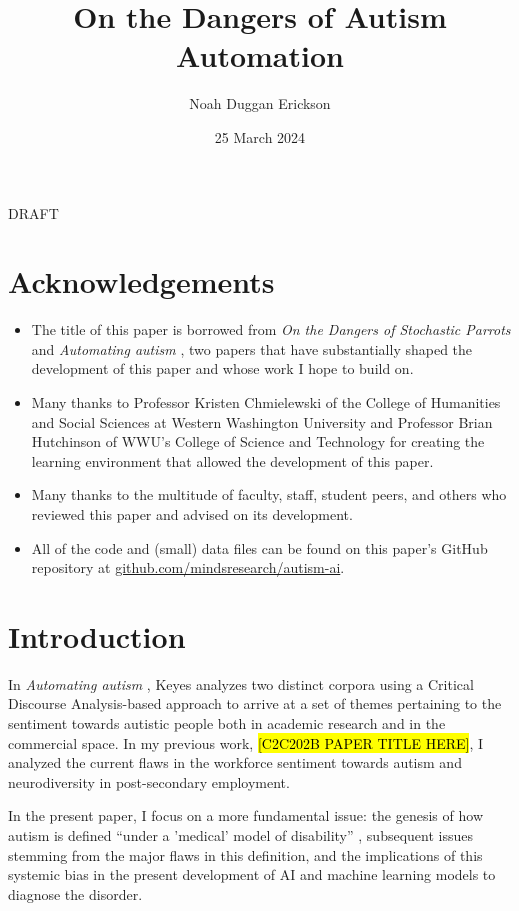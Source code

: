 \documentclass[letterpaper]{article}
\title{On the Dangers of Autism Automation}
\author{Noah Duggan Erickson}
\date{25 March 2024}
\begin{document}
\maketitle

{\Huge \centering DRAFT}

\section*{Acknowledgements}
\begin{itemize}
    \item The title of this paper is borrowed from \textit{On the Dangers of Stochastic Parrots} \cite{stopar} and \textit{Automating autism} \cite{auto}, two papers that have substantially shaped the development of this paper and whose work I hope to build on.
    \item Many thanks to Professor Kristen Chmielewski of the College of Humanities and Social Sciences at Western Washington University and Professor Brian Hutchinson of WWU's College of Science and Technology for creating the learning environment that allowed the development of this paper.
    \item Many thanks to the multitude of faculty, staff, student peers, and others who reviewed this paper and advised on its development.
    \item All of the code and (small) data files can be found on this paper's GitHub repository at \href{https://github.com/mindsresearch/autism-ai}{github.com/mindsresearch/autism-ai}.
\end{itemize}
\newpage
\tableofcontents
\newpage

\section{Introduction}
In \textit{Automating autism} \cite{auto}, Keyes analyzes two distinct corpora using a Critical Discourse Analysis-based approach to arrive at a set of themes pertaining to the sentiment towards autistic people both in academic research and in the commercial space. In my previous work, \hl{[C2C202B PAPER TITLE HERE]}, I analyzed the current flaws in the workforce sentiment towards autism and neurodiversity in post-secondary employment.

In the present paper, I focus on a more fundamental issue: the genesis of how autism is defined “under a 'medical' model of disability” \cite[p.~2]{auto}, subsequent issues stemming from the major flaws in this definition, and the implications of this systemic bias in the present development of AI and machine learning models to diagnose the disorder.
\end{document}
